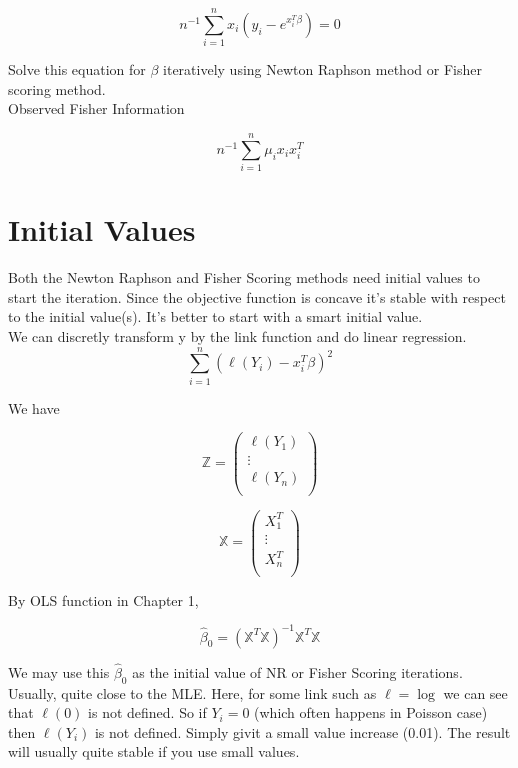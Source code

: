 \documentclass[11pt,fleqn]{book} %
\begin{document}
		$$ n^{-1} \sum_{i=1}^n x_i(y_i - e^{x_i^T \beta}) = 0$$

Solve this equation for $\beta$ iteratively using Newton Raphson method or Fisher scoring method. \\

Observed Fisher Information

	$$n^{-1} \sum_{i=1}^n \mu_i x_i x_i^T $$


\section{Initial Values}

Both the Newton Raphson and Fisher Scoring methods need initial values to start the iteration. Since the objective function is concave it's stable with respect to the initial value(s). It's better to start with a smart initial value.\\


We can discretly transform y by the link function and do linear regression. \\

		$$\sum_{i=1}^n (\ell(Y_i) - x_i^T \beta)^2 $$

We have 

		$$\mathbb{Z} = \begin{pmatrix}
			\ell(Y_1)\\
			\vdots\\
			\ell(Y_n)\\
		\end{pmatrix} $$

		$$\mathbb{X} = \begin{pmatrix}
			X_1^T\\
			\vdots\\
			X_n^T\\
		\end{pmatrix} $$

By OLS function in Chapter 1, 

		$$\hat{\beta}_0 = (\mathbb{X}^T \mathbb{X})^{-1} \mathbb{X}^T \mathbb{X} $$	

We may use this $\hat{\beta}_0$ as the initial value of NR or Fisher Scoring iterations. Usually, quite close to the MLE.  Here, for some link such as $\ell = \log$ we can see that $\ell(0)$ is not defined. So if $Y_i =0$ (which often happens in Poisson case) then $\ell(Y_i)$ is not defined. Simply givit a small value increase (0.01). The result will usually quite stable if you use small values. 	

	
\end{document}
